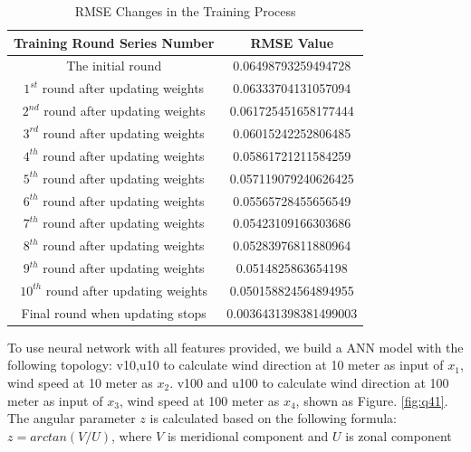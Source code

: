 \documentclass[a4paper, article, oneside, USenglish, IN5460]{memoir}
\begin{document}
{\begin{table}[htbp] %
    \centering %
    \caption{RMSE Changes in the Training Process } %
    \label{tab:example} %
    \begin{tabular}{|c|c|} %
        \hline %
        Training Round Series Number & RMSE Value \\ %
        \hline %
        The initial round & 0.06498793259494728 \\ %
        $1^{st}$ round after updating weights & 0.06333704131057094 \\ %
        $2^{nd}$ round after updating weights &  0.061725451658177444 \\ %
        $3^{rd}$ round after updating weights & 0.06015242252806485 \\ %
        $4^{th}$ round after updating weights & 0.05861721211584259 \\ %
        $5^{th}$ round after updating weights & 0.057119079240626425 \\ %
        $6^{th}$ round after updating weights & 0.05565728455656549 \\ %
        $7^{th}$ round after updating weights & 0.05423109166303686 \\ %
        $8^{th}$ round after updating weights &  0.05283976811880964 \\ %
        $9^{th}$ round after updating weights & 0.0514825863654198\\ %
        $10^{th}$ round after updating weights & 0.050158824564894955 \\ %
        Final round when updating stops & 0.0036431398381499003 \\ %
        
        
        \hline %
    \end{tabular}
\end{table}

\color{blue}To use neural network with all features provided, we build a ANN model with the following topology: v10,u10 to calculate wind direction at 10 meter as input of $x_1$, wind speed at 10 meter as $x_2$. v100 and u100 to calculate wind direction at 100 meter as input of $x_3$,  wind speed at 100 meter as $x_4$, shown as Figure. \ref{fig:q41}.
The angular parameter $z$ is calculated based on the following formula: 
$z = arctan(V/U)$, where  
$V$ is  meridional component and $U$ is zonal component

}
\end{document}
